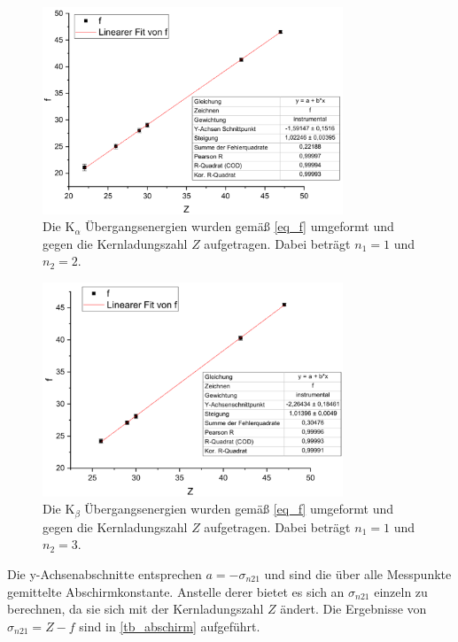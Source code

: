 \documentclass[
	a4paper,
	12pt,
	pagesize,
	ngerman
]{scrartcl}
\begin{document}
	\begin{figure}[H]
		\includegraphics[width=0.8\textwidth]{Ka}
		\centering
		\caption{Die $\text{K}_\alpha$ Übergangsenergien wurden gemäß \cref{eq_f} umgeformt und gegen die Kernladungszahl $Z$ aufgetragen. Dabei beträgt $n_1=1$ und $n_2=2$.}
		\label{fig_Ka}
		\centering
	\end{figure}

	\begin{figure}[H]
		\includegraphics[width=0.8\textwidth]{Kb}
		\centering
		\caption{Die $\text{K}_\beta$ Übergangsenergien wurden gemäß \cref{eq_f} umgeformt und gegen die Kernladungszahl $Z$ aufgetragen. Dabei beträgt $n_1=1$ und $n_2=3$.}
			\label{fig_Kb}
			\centering
	\end{figure}

	Die y-Achsenabschnitte entsprechen $a=-\sigma_{n21}$ und sind die über alle Messpunkte gemittelte Abschirmkonstante.
	Anstelle derer bietet es sich an $\sigma_{n21}$ einzeln zu berechnen, da sie sich mit der Kernladungszahl $Z$ ändert.
	Die Ergebnisse von $\sigma_{n21}=Z-f$ sind in \cref{tb_abschirm} aufgeführt.
\end{document}

